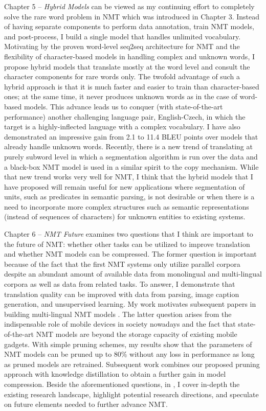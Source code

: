 Chapter 5 -- {\it Hybrid Models} can be viewed as my continuing effort to
completely solve the rare word problem in NMT which was introduced in Chapter 3.
Instead of having separate components to perform data annotation, train NMT
models, and post-process, I build a single model that handles unlimited
vocabulary. Motivating by the proven word-level seq2seq architecture for NMT and
the flexibility of character-based models in handling complex and unknown words,
I propose hybrid models that translate mostly at the word level and consult the
character components for rare words only. The twofold advantage of such a hybrid
approach is that it is much faster and easier to train than character-based
ones; at the same time, it never produces unknown words as in the case of
word-based models. This advance leads us to conquer (with state-of-the-art
performance) another challenging language pair, English-Czech, in which the
target is a highly-inflected language with a complex vocabulary. I have also
demonstrated an impressive gain from 2.1 to 11.4 BLEU points over models that
already handle unknown words. Recently, there is a new trend of translating at
purely subword level \cite{sennrich16sub,gnmt16} in which a segmentation
algorithm is run over the data and a black-box NMT model is used in a similar
spirit to the copy mechanism. While that new trend works very well for NMT, I
think that the hybrid models that I have proposed will remain useful for new
applications where segmentation of units, such as predicates in semantic
parsing, is not desirable or when there is a need to incorporate more complex structures
such as semantic representations (instead of sequences of characters) for
unknown entities to existing systems.

Chapter 6 -- {\it NMT Future} examines two questions that I think are important
to the future of NMT: whether other tasks can be utilized to improve translation
and whether NMT models can be compressed. The former question is important
because of the fact that the first NMT systems only utilize parallel corpora
despite an abundant amount of available data from monolingual and multi-lingual
corpora as well as data from related tasks. To answer, I demonstrate that
translation quality can be improved with data from parsing, image caption generation, and
unsupervised learning. My work motivates subsequent papers in building
multi-lingual NMT models \cite{zoph16,firat16,gnmt16multi,ha16}. The latter
question arises from the indispensable role of mobile devices in society
nowadays and the fact that state-of-the-art NMT models are beyond the storage
capacity of existing mobile gadgets. With simple pruning schemes, my results
show that the parameters of NMT models can be pruned up to 80\% without any loss
in performance as long as pruned models are retrained. Subsequent work
\cite{kim16distill} combines our proposed pruning approach with knowledge
distillation to obtain a further gain in model compression. Beside the
aforementioned questions, in , I cover in-depth the existing
research landscape, highlight potential research directions, and speculate on
future elements needed to further advance NMT.

